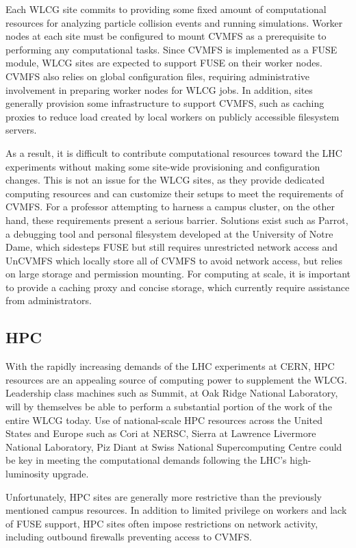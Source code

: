 \documentclass[sigconf]{acmart}
\begin{document}
Each WLCG site commits to providing some fixed amount of computational resources for analyzing particle collision events and running simulations.
Worker nodes at each site must be configured to mount CVMFS as a prerequisite to performing any computational tasks.
Since CVMFS is implemented as a FUSE module,
WLCG sites are expected to support FUSE on their worker nodes.
CVMFS also relies on global configuration files,
requiring administrative involvement in preparing worker nodes for WLCG jobs.
In addition, sites generally provision some infrastructure to support CVMFS,
such as caching proxies to reduce load created by local workers on publicly accessible filesystem servers.

As a result, it is difficult to contribute computational resources toward the LHC experiments without making some site-wide provisioning and configuration changes.
This is not an issue for the WLCG sites,
as they provide dedicated computing resources and can customize their setups to meet the requirements of CVMFS.
For a professor attempting to harness a campus cluster,
on the other hand, these requirements present a serious barrier.
Solutions exist such as
Parrot, a debugging tool and personal filesystem developed at the University of Notre Dame,
which sidesteps FUSE but still requires unrestricted network access and
UnCVMFS which locally store all of CVMFS to avoid network access, 
but relies on large storage and permission mounting.
For computing at scale, it is important to provide a caching proxy and concise storage,
which currently require assistance from administrators.

\subsection{HPC}

With the rapidly increasing demands of the LHC experiments at CERN,
HPC resources are an appealing source of computing power to supplement the WLCG.
Leadership class machines such as Summit, at Oak Ridge National Laboratory, will by themselves be able to perform a substantial portion of the work of the entire WLCG today.
Use of national-scale HPC resources across the United States and Europe such as Cori at NERSC, Sierra at Lawrence Livermore National Laboratory, Piz Diant at Swiss National Supercomputing Centre could be key in meeting the computational demands following the LHC's high-luminosity upgrade.

Unfortunately, HPC sites are generally more restrictive than the previously mentioned campus resources.
In addition to limited privilege on workers and lack of FUSE support,
HPC sites often impose restrictions on network activity,
including outbound firewalls preventing access to CVMFS.
\end{document}
